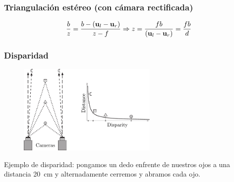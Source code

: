 \begin{frame}
    \frametitle{Triangulación estéreo (con cámara rectificada)}
    
       \begin{figure}[!htb]
        \centering
        \hspace{1em}
    \end{figure}
    
    \begin{equation*}
        \frac{b}{z} = \frac{b - (\boldsymbol{\mathbf{u}}_{l} - \boldsymbol{\mathbf{u}}_{r})}{z-f} \Rightarrow z = \frac{fb}{(\boldsymbol{\mathbf{u}}_{l} - \boldsymbol{\mathbf{u}}_{r})}  = \frac{fb}{d}
    \end{equation*}
    
\end{frame}

\begin{frame}
    \frametitle{Disparidad}
    \footnotesize
    \begin{figure}[!h]
        \includegraphics[width=0.6\textwidth]{images/disparity.pdf}
    \end{figure}

    Ejemplo de disparidad: pongamos un dedo enfrente de nuestros ojos a una distancia \SI{20}{\centi\meter} y alternadamente cerremos y abramos cada ojo.

\end{frame}


